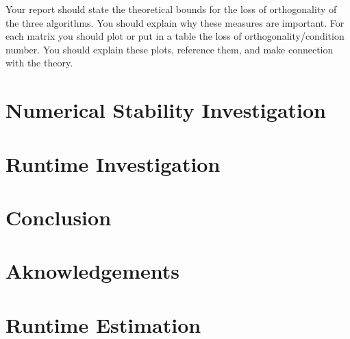 \documentclass[a4paper, 12pt,oneside]{article}
\begin{document}
		Your report should state the theoretical bounds for the loss of orthogonality of the three algorithms. You should explain why these measures are important. For each matrix you should plot or put in a table the loss of orthogonality/condition number. You should explain these plots, reference them, and make connection with the theory.
	\section{Numerical Stability Investigation}
	\section{Runtime Investigation}
	\section{Conclusion}
	\section*{Aknowledgements}
	\appendix
		\section{Runtime Estimation}\label{appendix:runtime_estimation}
\end{document}
